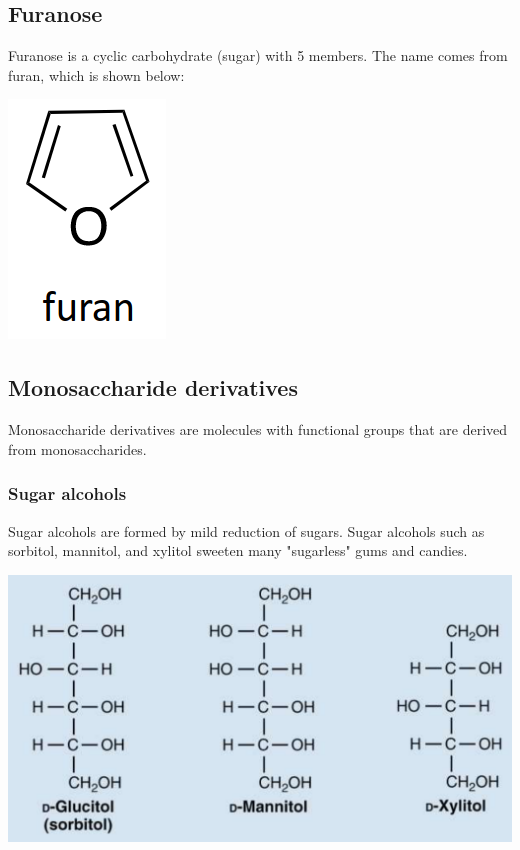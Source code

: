\documentclass[11pt]{article}
\begin{document}
\subsection{Furanose}
\label{sec:org8b1ca6b}
Furanose is a cyclic carbohydrate (sugar) with 5 members. The name comes from furan, which is shown below:

\begin{center}
\includegraphics[scale=1.0]{./images/furan.png}
\end{center}
\subsection{Monosaccharide derivatives}
\label{sec:org7da12d3}
Monosaccharide derivatives are molecules with functional groups that are derived from monosaccharides.
\subsubsection{Sugar alcohols}
\label{sec:org5c9a3d9}
Sugar alcohols are formed by mild reduction of sugars. Sugar alcohols such as sorbitol, mannitol, and xylitol sweeten many "sugarless" gums and candies.
\begin{center}
\includegraphics[width=.9\linewidth]{./images/sugar-alcohols.png}
\end{center}
\end{document}
